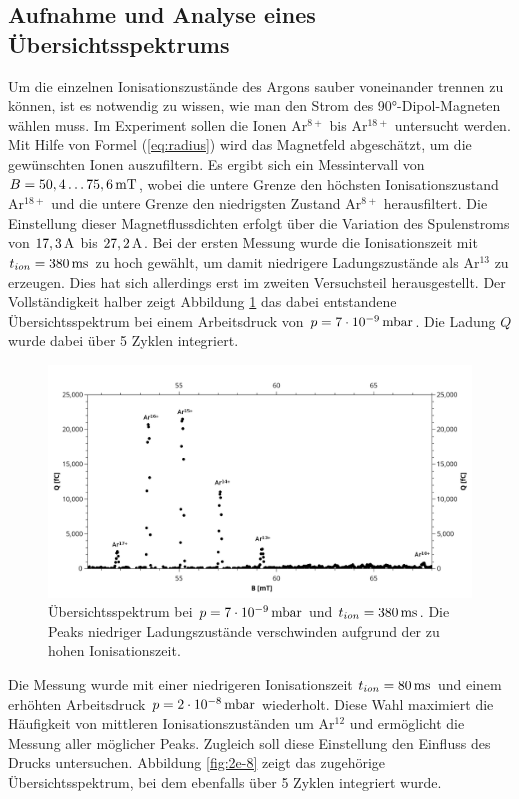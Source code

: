 	\subsection{Aufnahme und Analyse eines Übersichtsspektrums}
		Um die einzelnen Ionisationszustände des Argons sauber voneinander trennen zu können, ist es notwendig zu wissen, wie man den Strom des 90°-Dipol-Magneten wählen muss. Im Experiment sollen die Ionen Ar$^{8+}$ bis Ar$^{18+}$ untersucht werden. Mit Hilfe von Formel (\ref{eq:radius}) wird das Magnetfeld abgeschätzt, um die gewünschten Ionen auszufiltern. Es ergibt sich ein Messintervall von $B = 50,4 \dots \unit[75,6]{mT}$, wobei die untere Grenze den höchsten Ionisationszustand Ar$^{18+}$ und die untere Grenze den niedrigsten Zustand Ar$^{8+}$ herausfiltert. Die Einstellung dieser Magnetflussdichten erfolgt über die Variation des Spulenstroms von $\unit[17,3]{A}$ bis $\unit[27,2]{A}$. 
		Bei der ersten Messung wurde die Ionisationszeit mit $t_{ion} = \unit[380]{ms}$ zu hoch gewählt, um damit niedrigere Ladungszustände als Ar$^13$ zu erzeugen. Dies hat sich allerdings erst im zweiten Versuchsteil herausgestellt. Der Vollständigkeit halber zeigt Abbildung \ref{fig:7e-9} das dabei entstandene Übersichtsspektrum bei einem Arbeitsdruck von $p = \unit[7\cdot 10^{-9}]{mbar}$. Die Ladung $Q$ wurde dabei über 5 Zyklen integriert.\\
		\begin{figure}
					\centering
					\includegraphics[width=\linewidth]{pic/7e-9_beschriftet}
					\caption{Übersichtsspektrum bei $p = \unit[7\cdot 10^{-9}]{mbar}$ und $t_{ion} = \unit[380]{ms}$. Die Peaks niedriger Ladungszustände verschwinden aufgrund der zu hohen Ionisationszeit.}
					\label{fig:7e-9}
		\end{figure}
		Die Messung wurde mit einer niedrigeren Ionisationszeit $t_{ion} = \unit[80]{ms}$ und einem erhöhten Arbeitsdruck $p = \unit[2\cdot 10^{-8}]{mbar}$ wiederholt. Diese Wahl maximiert die Häufigkeit von mittleren Ionisationszuständen um Ar$^{12}$ und ermöglicht die Messung aller möglicher Peaks. Zugleich soll diese Einstellung den Einfluss des Drucks untersuchen. Abbildung \ref{fig:2e-8} zeigt das zugehörige Übersichtsspektrum, bei dem ebenfalls über 5 Zyklen integriert wurde.
